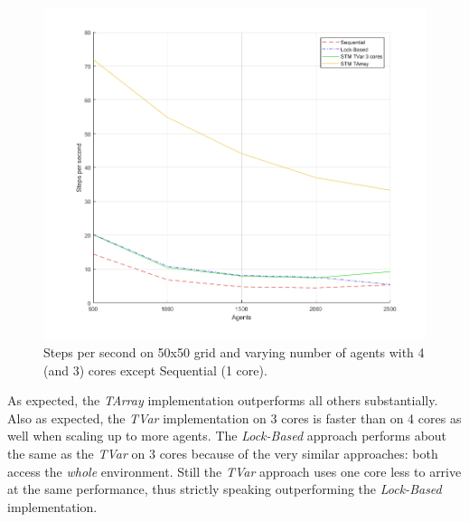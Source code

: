 \begin{figure}
	\centering
	\includegraphics[width=1.0\textwidth, angle=0]{./fig/concurrentabs/sugarscape/varying_agents.png}
	\caption{Steps per second on 50x50 grid and varying number of agents with 4 (and 3) cores except Sequential (1 core).}
	\label{fig:state_results_agentsscale_time}
\end{figure}

As expected, the \textit{TArray} implementation outperforms all others substantially. Also as expected, the \textit{TVar} implementation on 3 cores is faster than on 4 cores as well when scaling up to more agents. The \textit{Lock-Based} approach performs about the same as the \textit{TVar} on 3 cores because of the very similar approaches: both access the \textit{whole} environment. Still the \textit{TVar} approach uses one core less to arrive at the same performance, thus strictly speaking outperforming the \textit{Lock-Based} implementation.

